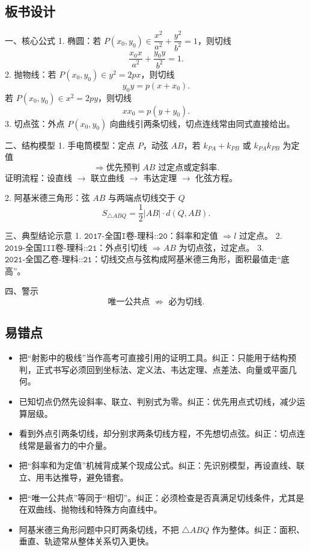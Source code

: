 \documentclass[UTF8,a4paper,11pt]{ctexart}
\begin{document}
\subsection*{板书设计}

一、核心公式
1. 椭圆：若 $P(x_0,y_0)\in \dfrac{x^2}{a^2}+\dfrac{y^2}{b^2}=1$，则切线
\[
\frac{x_0x}{a^2}+\frac{y_0y}{b^2}=1.
\]
2. 抛物线：若 $P(x_0,y_0)\in y^2=2px$，则切线
\[
y_0y=p(x+x_0).
\]
若 $P(x_0,y_0)\in x^2=2py$，则切线
\[
xx_0=p(y+y_0).
\]
3. 切点弦：外点 $P(x_0,y_0)$ 向曲线引两条切线，切点连线常由同式直接给出。

二、结构模型
1. 手电筒模型：定点 $P$，动弦 $AB$，若 $k_{PA}+k_{PB}$ 或 $k_{PA}k_{PB}$ 为定值
\[
\Rightarrow \text{优先预判 }AB\text{ 过定点或定斜率}.
\]
证明流程：设直线 $\to$ 联立曲线 $\to$ 韦达定理 $\to$ 化弦方程。

2. 阿基米德三角形：弦 $AB$ 与两端点切线交于 $Q$
\[
S_{\triangle ABQ}=\frac12|AB|\cdot d(Q,AB).
\]

三、典型结论示意
1. $\texttt{2017-全国I卷-理科::20}$：斜率和定值 $\Rightarrow l$ 过定点。
2. $\texttt{2019-全国III卷-理科::21}$：外点引切线 $\Rightarrow AB$ 为切点弦，过定点。
3. $\texttt{2021-全国乙卷-理科::21}$：切线交点与弦构成阿基米德三角形，面积最值走“底高”。

四、警示
\[
\text{唯一公共点 }\not\Rightarrow \text{ 必为切线}.
\]

\subsection*{易错点}

\begin{itemize}

\item 把“射影中的极线”当作高考可直接引用的证明工具。纠正：只能用于结构预判，正式书写必须回到坐标法、定义法、韦达定理、点差法、向量或平面几何。

\item 已知切点仍然先设斜率、联立、判别式为零。纠正：优先用点式切线，减少运算层级。

\item 看到外点引两条切线，却分别求两条切线方程，不先想切点弦。纠正：切点连线常是最省力的中介量。

\item 把“斜率和为定值”机械背成某个现成公式。纠正：先识别模型，再设直线、联立、用韦达推导，避免错套。

\item 把“唯一公共点”等同于“相切”。纠正：必须检查是否真满足切线条件，尤其是在双曲线、抛物线和特殊方向直线中。

\item 阿基米德三角形问题中只盯两条切线，不把 $\triangle ABQ$ 作为整体。纠正：面积、垂直、轨迹常从整体关系切入更快。

\end{itemize}
\end{document}
